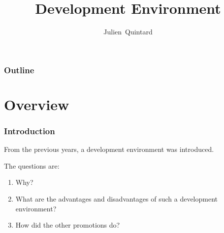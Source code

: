 %
%
%
%
%
%

%
%

\def\path{../..}

%
%



%
%

\title{Development Environment}

%
%

\author
{
  Julien~Quintard
}

%
%



%
%

\begin{frame}
  \titlepage

  \begin{center}
    \logos
  \end{center}
\end{frame}

%
%

\begin{frame}
  \frametitle{Outline}
  \tableofcontents
\end{frame}

%
%

\section{Overview}


\begin{frame}
  \frametitle{Introduction}

  From the previous years, a development environment was introduced.

  \nl

  The questions are:

  \begin{enumerate}[<+->]
    \item
      Why?
    \item
      What are the advantages and disadvantages of such a
      development environment?
    \item
      How did the other promotions do?
  \end{enumerate}
\end{frame}

